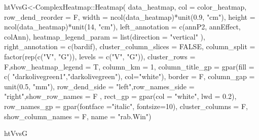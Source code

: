 \documentclass[]{interact}
\theoremstyle{plain}%
\theoremstyle{definition}
\theoremstyle{remark}
\newenvironment{Shaded}{\begin{snugshade}}{\end{snugshade}}
\newcommand{\AttributeTok}[1]{\textcolor[rgb]{0.77,0.63,0.00}{#1}}
\newcommand{\ConstantTok}[1]{\textcolor[rgb]{0.00,0.00,0.00}{#1}}
\newcommand{\DecValTok}[1]{\textcolor[rgb]{0.00,0.00,0.81}{#1}}
\newcommand{\FloatTok}[1]{\textcolor[rgb]{0.00,0.00,0.81}{#1}}
\newcommand{\FunctionTok}[1]{\textcolor[rgb]{0.00,0.00,0.00}{#1}}
\newcommand{\NormalTok}[1]{#1}
\newcommand{\OtherTok}[1]{\textcolor[rgb]{0.56,0.35,0.01}{#1}}
\newcommand{\SpecialCharTok}[1]{\textcolor[rgb]{0.00,0.00,0.00}{#1}}
\newcommand{\StringTok}[1]{\textcolor[rgb]{0.31,0.60,0.02}{#1}}
\begin{document}
\begin{Shaded}
\begin{Highlighting}[]
\NormalTok{htVvsG}\OtherTok{\textless{}{-}}\NormalTok{ComplexHeatmap}\SpecialCharTok{::}\FunctionTok{Heatmap}\NormalTok{(}
\NormalTok{  data\_heatmap, }\AttributeTok{col =}\NormalTok{ color\_heatmap, }\AttributeTok{row\_dend\_reorder =}\NormalTok{ F, }
  \AttributeTok{width =} \FunctionTok{ncol}\NormalTok{(data\_heatmap)}\SpecialCharTok{*}\FunctionTok{unit}\NormalTok{(}\FloatTok{0.9}\NormalTok{, }\StringTok{"cm"}\NormalTok{),}
  \AttributeTok{height =} \FunctionTok{ncol}\NormalTok{(data\_heatmap)}\SpecialCharTok{*}\FunctionTok{unit}\NormalTok{(}\DecValTok{14}\NormalTok{, }\StringTok{"cm"}\NormalTok{),}
  \AttributeTok{left\_annotation =}  \FunctionTok{c}\NormalTok{(annP2, annEffect, colAnn),}
  \AttributeTok{heatmap\_legend\_param =} \FunctionTok{list}\NormalTok{(}\AttributeTok{direction =} \StringTok{"vertical"}\NormalTok{ ),}
  \AttributeTok{right\_annotation =} \FunctionTok{c}\NormalTok{(bardif),}
  \AttributeTok{cluster\_column\_slices =} \ConstantTok{FALSE}\NormalTok{,}
  \AttributeTok{column\_split =} \FunctionTok{factor}\NormalTok{(}\FunctionTok{rep}\NormalTok{(}\FunctionTok{c}\NormalTok{(}\StringTok{"V"}\NormalTok{, }\StringTok{"G"}\NormalTok{)), }\AttributeTok{levels =} \FunctionTok{c}\NormalTok{(}\StringTok{"V"}\NormalTok{, }\StringTok{"G"}\NormalTok{)),}
  \AttributeTok{cluster\_rows =}\NormalTok{ F,}\AttributeTok{show\_heatmap\_legend =}\NormalTok{ T,}
  \AttributeTok{column\_km =} \DecValTok{1}\NormalTok{, }\AttributeTok{column\_title\_gp =} \FunctionTok{gpar}\NormalTok{(}\AttributeTok{fill =} \FunctionTok{c}\NormalTok{(}
  \StringTok{"darkolivegreen1"}\NormalTok{,}\StringTok{"darkolivegreen"}\NormalTok{), }\AttributeTok{col=}\StringTok{"white"}\NormalTok{),}
  \AttributeTok{border =}\NormalTok{ F, }\AttributeTok{column\_gap =} \FunctionTok{unit}\NormalTok{(}\FloatTok{0.5}\NormalTok{, }\StringTok{"mm"}\NormalTok{), }
  \AttributeTok{row\_dend\_side =} \StringTok{"left"}\NormalTok{,}\AttributeTok{row\_names\_side =} \StringTok{"right"}\NormalTok{,}\AttributeTok{show\_row\_names =}\NormalTok{ F ,}
  \AttributeTok{rect\_gp =} \FunctionTok{gpar}\NormalTok{(}\AttributeTok{col =} \StringTok{"white"}\NormalTok{, }\AttributeTok{lwd =} \FloatTok{0.2}\NormalTok{), }
  \AttributeTok{row\_names\_gp =} \FunctionTok{gpar}\NormalTok{(}\AttributeTok{fontface =}\StringTok{"italic"}\NormalTok{, }\AttributeTok{fontsize=}\DecValTok{10}\NormalTok{),}
  \AttributeTok{cluster\_columns =}\NormalTok{ F,}
  \AttributeTok{show\_column\_names =}\NormalTok{ F, }\AttributeTok{name =} \StringTok{"rab.Win"}\NormalTok{)}


\NormalTok{htVvsG   }
\end{Highlighting}
\end{Shaded}
\end{document}
